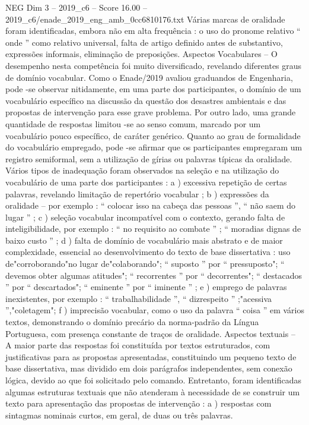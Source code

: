 \begin{textsample}{NEG Dim 3 – 2019\_c6 – Score 16.00 – 2019\_c6/enade\_2019\_eng\_amb\_0cc6810176.txt}
Várias marcas de oralidade foram identificadas, embora não em alta frequência : o uso do pronome relativo “ onde ” como relativo universal, falta de artigo definido antes de substantivo, expressões informais, eliminação de preposições.
Aspectos Vocabulares – O desempenho nesta competência foi muito diversificado, revelando diferentes graus de domínio vocabular.
Como o Enade/2019 avaliou graduandos de Engenharia, pode -se observar nitidamente, em uma parte dos participantes, o domínio de um vocabulário específico na discussão da questão dos desastres ambientais e das propostas de intervenção para esse grave problema.
Por outro lado, uma grande quantidade de respostas limitou -se ao senso comum, marcado por um vocabulário pouco específico, de caráter genérico.
Quanto ao grau de formalidade do vocabulário empregado, pode -se afirmar que os participantes empregaram um registro semiformal, sem a utilização de gírias ou palavras típicas da oralidade.
Vários tipos de inadequação foram observados na seleção e na utilização do vocabulário de uma parte dos participantes : a ) excessiva repetição de certas palavras, revelando limitação de repertório vocabular ; b ) expressões da oralidade – por exemplo : “ colocar isso na cabeça das pessoas ”, “ não saem do lugar ” ; c ) seleção vocabular incompatível com o contexto, gerando falta de inteligibilidade, por exemplo : “ no requisito ao combate ” ; “ moradias dignas de baixo custo ” ; d ) falta de domínio de vocabulário mais abstrato e de maior complexidade, essencial ao desenvolvimento do texto de base dissertativa : uso de"corroborando"no lugar de"colaborando"; “ suposto ” por “ pressuposto"; “ devemos obter algumas atitudes"; “ recorrentes ” por “ decorrentes"; “ destacados ” por “ descartados"; “ eminente ” por “ iminente ” ; e ) emprego de palavras inexistentes, por exemplo : “ trabalhabilidade ”, “ dizrespeito ” ;"acessiva ”,"coletagem"; f ) imprecisão vocabular, como o uso da palavra “ coisa ” em vários textos, demonstrando o domínio precário da norma-padrão da Língua Portuguesa, com presença constante de traços de oralidade.
Aspectos textuais – A maior parte das respostas foi constituída por textos estruturados, com justificativas para as propostas apresentadas, constituindo um pequeno texto de base dissertativa, mas dividido em dois parágrafos independentes, sem conexão lógica, devido ao que foi solicitado pelo comando.
Entretanto, foram identificadas algumas estruturas textuais que não atenderam à necessidade de se construir um texto para apresentação das propostas de intervenção : a ) respostas com sintagmas nominais curtos, em geral, de duas ou três palavras.

\end{textsample}
